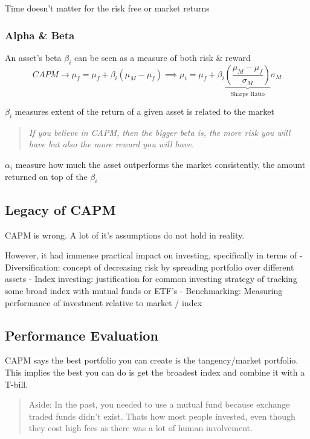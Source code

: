 \documentclass[
  oneside]{book}
\begin{document}
Time doesn't matter for the risk free or market returns

\hypertarget{alpha-beta}{%
\subsubsection{Alpha \& Beta}\label{alpha-beta}}

An asset's beta \(\beta_{i}\) can be seen as a measure of both risk \& reward
\[
CAPM \to \mu_{f}  = \mu_{f} + \beta_{i}(\mu_{M}-\mu_{f}) \implies \mu_{i} = \mu_{f} + \beta_{i}\underbrace{ \left(\frac{\mu_{M}-\mu_{f}}{\sigma_{M}}  \right)}_{ \text{Sharpe Ratio} }\sigma_{M}
\]

\(\beta_{i}\) measures extent of the return of a given asset is related to the market

\begin{quote}
\emph{If you believe in CAPM, then the bigger beta is, the more risk you will have but also the more reward you will have.}
\end{quote}

\(\alpha_{i}\) measure how much the asset outperforms the market consistently, the amount returned on top of the \(\beta_{i}\)

\hypertarget{legacy-of-capm}{%
\subsection{Legacy of CAPM}\label{legacy-of-capm}}

CAPM is wrong. A lot of it's assumptions do not hold in reality.

However, it had immense practical impact on investing, specifically in terms of
- Diversification: concept of decreasing risk by spreading portfolio over different assets
- Index investing: justification for common investing strategy of tracking some broad index with mutual funds or ETF's
- Benchmarking: Measuring performance of investment relative to market / index

\hypertarget{performance-evaluation}{%
\subsection{Performance Evaluation}\label{performance-evaluation}}

CAPM says the best portfolio you can create is the tangency/market portfolio. This implies the best you can do is get the broadest index and combine it with a T-bill.

\begin{quote}
Aside: In the past, you needed to use a mutual fund because exchange traded funds didn't exist. Thats how most people invested, even though they cost high fees as there was a lot of human involvement.
\end{quote}
\end{document}
